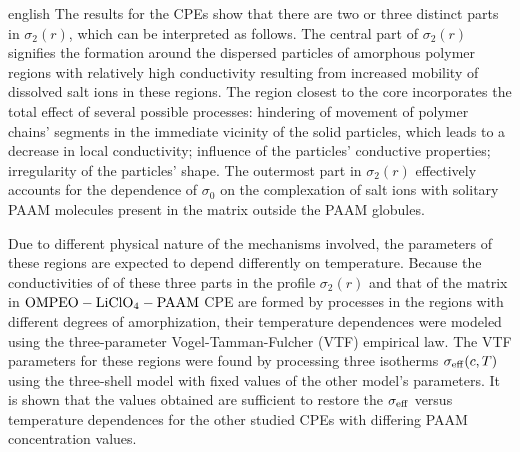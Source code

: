 \begin{otherlanguage*}{english}
The results for the CPEs show that there are two or three distinct parts in $ \sigma_2 (r) $, which can be interpreted as follows. The central part of $ \sigma_2 (r) $ signifies the formation around the dispersed particles of amorphous polymer regions with relatively high conductivity resulting from increased mobility of dissolved salt ions in these regions. The region closest to the core incorporates the total effect of several possible processes: hindering of movement of polymer chains' segments in the immediate vicinity of the solid particles, which leads to a decrease in local conductivity; influence of the particles' conductive properties; irregularity of the particles' shape. The outermost part in $ \sigma_2 (r) $ effectively accounts for the dependence of $ \sigma_0 $ on the complexation of salt ions with  solitary PAAM molecules present in the matrix outside the PAAM globules.

Due to different physical nature of the mechanisms involved, the parameters of these regions are expected to depend differently on temperature. Because the conductivities of of these three parts in the profile $ \sigma_2 (r) $ and that of the matrix in $ \rm OMPEO-LiClO_4-PAAM $  CPE are formed by processes in the regions with different degrees of amorphization, their temperature dependences were modeled using the three-parameter Vogel-Tamman-Fulcher  (VTF) empirical law. The VTF parameters for these regions were found by processing three  isotherms $ \sigma_ {\rm eff} (c, T) $ using the three-shell model with fixed values  of the other model's parameters. It is shown that the  values obtained are sufficient to restore the $ \sigma_ {\rm eff} $ versus temperature dependences for the other studied CPEs with differing  PAAM concentration values.


\end{otherlanguage*}
